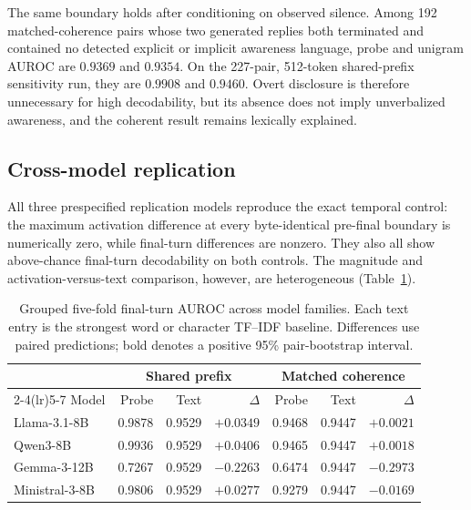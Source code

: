 \documentclass{article}
\begin{document}
The same boundary holds after conditioning on observed silence. Among 192
matched-coherence pairs whose two generated replies both terminated and
contained no detected explicit or implicit awareness language, probe and
unigram AUROC are $0.9369$ and $0.9354$. On the 227-pair, 512-token
shared-prefix sensitivity run, they are $0.9908$ and $0.9460$. Overt disclosure
is therefore unnecessary for high decodability, but its absence does not imply
unverbalized awareness, and the coherent result remains lexically explained.

\subsection{Cross-model replication}

All three prespecified replication models reproduce the exact temporal
control: the maximum activation difference at every byte-identical pre-final
boundary is numerically zero, while final-turn differences are nonzero. They
also all show above-chance final-turn decodability on both controls. The
magnitude and activation-versus-text comparison, however, are heterogeneous
(Table~\ref{tab:crossmodel}).

\begin{table}[t]
  \caption{Grouped five-fold final-turn AUROC across model families. Each text
  entry is the strongest word or character TF--IDF baseline. Differences use
  paired predictions; bold denotes a positive 95\% pair-bootstrap interval.}
  \label{tab:crossmodel}
  \centering
  \small
  \begin{tabular}{lrrr@{\qquad}rrr}
    \toprule
      & \multicolumn{3}{c}{Shared prefix} & \multicolumn{3}{c}{Matched coherence} \\
    \cmidrule(lr){2-4}\cmidrule(lr){5-7}
    Model & Probe & Text & $\Delta$ & Probe & Text & $\Delta$ \\
    \midrule
    Llama-3.1-8B & 0.9878 & 0.9529 & $\mathbf{+0.0349}$ & 0.9468 & 0.9447 & $+0.0021$ \\
    Qwen3-8B & 0.9936 & 0.9529 & $\mathbf{+0.0406}$ & 0.9465 & 0.9447 & $+0.0018$ \\
    Gemma-3-12B & 0.7267 & 0.9529 & $-0.2263$ & 0.6474 & 0.9447 & $-0.2973$ \\
    Ministral-3-8B & 0.9806 & 0.9529 & $\mathbf{+0.0277}$ & 0.9279 & 0.9447 & $-0.0169$ \\
    \bottomrule
  \end{tabular}
\end{table}
\end{document}
